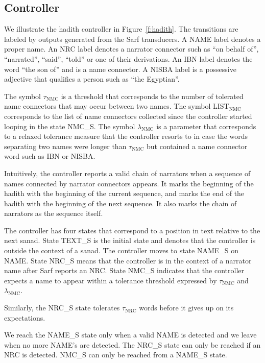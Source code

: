 \documentclass[11pt]{article}
\begin{document}
\subsection{Controller}
\label{sec:controller}

We illustrate the hadith controller 
in Figure~\ref{f:hadith}. 
The transitions are labeled by outputs generated from 
the Sarf transducers. 
A NAME label denotes a proper name.
An NRC label denotes a narrator connector such as
 ``on behalf of'',  ``narrated'',  ``said'', 
 ``told'' or one of their derivations. 
An IBN label denotes the word  ``the son of'' and is a name connector.
A NISBA label is a possessive adjective that qualifies a person such 
as  ``the Egyptian''. 

The symbol $\tau_{\mbox{NMC}}$ is a threshold
that corresponds to the number of tolerated name connectors 
that may occur between two names. 
The symbol LIST$_{\mbox{NMC}}$ corresponds to the list 
of name connectors collected since the controller
started looping in the state NMC\_S. 
The symbol $\lambda_{\mbox{NMC}}$ is a parameter 
that corresponds to a relaxed tolerance measure that
the controller resorts to in case the words separating
two names were longer than $\tau_{\mbox{NMC}}$ but 
contained a name connector word such as IBN or NISBA.

Intuitively, the controller reports a valid chain 
of narrators when a sequence of names
connected by narrator connectors appears. 
It marks the beginning of the hadith with the beginning of 
the current sequence,
and marks the end of the hadith with the beginning of the 
next sequence. 
It also marks the chain of narrators as the sequence itself. 

The controller has four states that correspond to 
a position in text relative to the next sanad. 
State TEXT\_S is the initial state and denotes that
the controller is outside the context of a sanad.
The controller moves to state NAME\_S on
NAME.
State NRC\_S means that the controller is in the context
of a narrator name after Sarf reports an NRC.
State NMC\_S
indicates that the controller expects a name to appear within 
a tolerance threshold expressed by 
$\tau_{\mbox{NMC}}$ and $\lambda_{\mbox{NMC}}$.


Similarly, the NRC\_S state tolerates $\tau_{\mbox{NRC}}$ words 
before it gives up on its expectations. 

We reach the NAME\_S state only when a
valid NAME is detected and we leave when no more NAME's are detected.
The NRC\_S state can only be reached if an NRC is detected.
NMC\_S can only be reached from a NAME\_S state.
\end{document}
